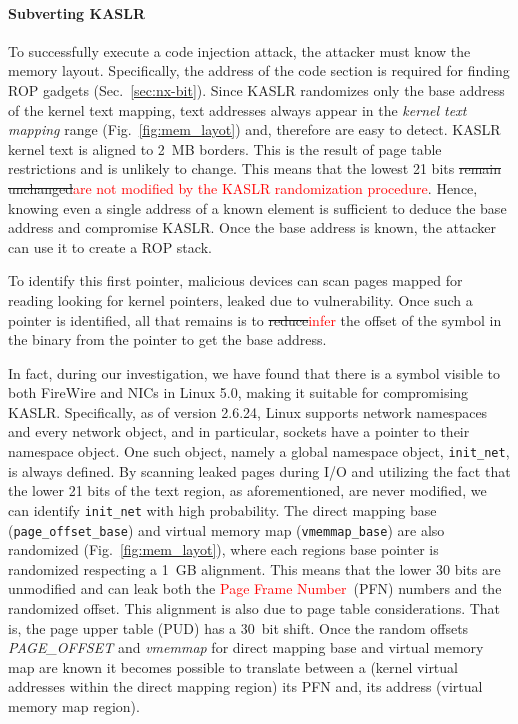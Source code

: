 
\paragraph{Subverting KASLR}
To successfully execute a code injection attack, the attacker must know the memory layout. Specifically, the address of the code section is required for finding ROP gadgets (Sec.~\ref{sec:nx-bit}). 
Since KASLR randomizes only the base address of the kernel text mapping, text addresses always appear in the \textit{kernel text mapping} range (Fig.~\ref{fig:mem_layot}) and, therefore are easy to detect. KASLR kernel text is aligned to 2~MB borders. This is the result of page table restrictions and is unlikely to change. This means that the lowest 21 bits \sout{remain unchanged}\textcolor{red}{are not modified by the KASLR randomization procedure}. Hence, knowing even a single address of a known element is sufficient to deduce the base address and compromise KASLR. Once the base address is known, the attacker can use it to create a ROP stack.

To identify this first pointer, malicious devices can scan pages mapped for reading looking for kernel pointers, leaked due to \subpage{} vulnerability. Once such a pointer is identified, all that remains is to \sout{reduce}\textcolor{red}{infer} the offset of the symbol in the binary from the pointer to get the base address.%

In fact, during our investigation, we have found that there is a symbol visible to both FireWire and NICs in Linux 5.0, making it suitable for compromising KASLR. Specifically, as of version 2.6.24, Linux supports network namespaces and every network object, and in particular, sockets have a pointer to their namespace object. One such object, namely a global namespace object, \texttt{init\_net}, is always defined. By scanning leaked pages during I/O and utilizing the fact that the lower 21 bits of the text region, as aforementioned, are never modified, we can identify \texttt{init\_net} with high probability.
The direct mapping base (\texttt{page\_offset\_base}) and virtual memory map (\texttt{vmemmap\_base}) are also randomized (Fig.~\ref{fig:mem_layot}), where each regions base pointer is randomized respecting a 1~GB alignment. This means that the lower 30 bits are unmodified and can leak both the \textcolor{red}{Page Frame Number}~(PFN) numbers and the randomized offset. This alignment is also due to page table considerations. That is, the page upper table (PUD) has a 30~bit shift. Once the random offsets \textit{PAGE\_OFFSET} and \textit{vmemmap} for direct mapping base and virtual memory map are known it becomes possible to translate between a \kva{} (kernel virtual addresses within the direct mapping region) its PFN and, its \page{} address (virtual memory map region).

